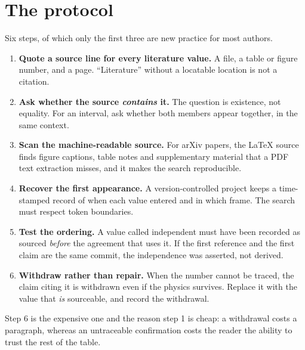 \documentclass[11pt,a4paper]{article}
\begin{document}
\section{The protocol}
Six steps, of which only the first three are new practice for most authors.
\begin{enumerate}
    \item \textbf{Quote a source line for every literature value.} A file,
    a table or figure number, and a page. ``Literature'' without a
    locatable location is not a citation.
    \item \textbf{Ask whether the source \emph{contains} it.} The question
    is existence, not equality. For an interval, ask whether both members
    appear together, in the same context.
    \item \textbf{Scan the machine-readable source.} For arXiv papers, the
    LaTeX source finds figure captions, table notes and supplementary
    material that a PDF text extraction misses, and it makes the search
    reproducible.
    \item \textbf{Recover the first appearance.} A version-controlled
    project keeps a time-stamped record of when each value entered and in
    which frame. The search must respect token boundaries.
    \item \textbf{Test the ordering.} A value called independent must have
    been recorded as sourced \emph{before} the agreement that uses it. If
    the first reference and the first claim are the same commit, the
    independence was asserted, not derived.
    \item \textbf{Withdraw rather than repair.} When the number cannot be
    traced, the claim citing it is withdrawn even if the physics survives.
    Replace it with the value that \emph{is} sourceable, and record the
    withdrawal.
\end{enumerate}
Step 6 is the expensive one and the reason step 1 is cheap: a withdrawal
costs a paragraph, whereas an untraceable confirmation costs the reader the
ability to trust the rest of the table.
\end{document}
